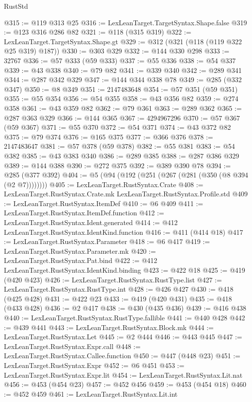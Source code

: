 \begin{lexlean}{RustStd}
\begin{coremodule}
@315 := @119 @313 @25
@316 := LexLeanTarget.TargetSyntax.Shape.false
@319 := @123 @316 @286 @82
@321 := @118 (@315 @319)
@322 := LexLeanTarget.TargetSyntax.Shape.gt
@329 := @312 (@321 (@118 (@119 @322 @25 @319) @187))
@330 := @303 @329
@332 := @144 @330 @298
@333 := 32767
@336 := @57 @333 (@59 @333)
@337 := @55 @336
@338 := @54 @337
@339 := @43 @338
@340 := @79 @82
@341 := @339 @340
@342 := @289 @341
@344 := @287 @342 @329
@347 := @144 @344 @338 @78
@349 := @285 (@332 @347)
@350 := @8 @349
@351 := 2147483648
@354 := @57 @351 (@59 @351)
@355 := @55 @354
@356 := @54 @355
@358 := @43 @356 @82
@359 := @274 @358
@361 := @43 @359 @82
@362 := @79 @361
@363 := @289 @362
@365 := @287 @363 @329
@366 := @144 @365
@367 := 4294967296
@370 := @57 @367 (@59 @367)
@371 := @55 @370
@372 := @54 @371
@374 := @43 @372 @82
@375 := @79 @374
@376 := @165 @375
@377 := @366 @376
@378 := 2147483647
@381 := @57 @378 (@59 @378)
@382 := @55 @381
@383 := @54 @382
@385 := @43 @383 @340
@386 := @289 @385
@388 := @287 @386 @329
@389 := @144 @388
@390 := @272 @375
@392 := @389 @390 @78
@394 := @285 (@377 @392)
@404 := @5 (@94 (@192 (@251 (@267 (@281 (@350 (@8 @394 (@2 @7))))))))
@405 := LexLeanTarget.RustSyntax.Crate
@408 := LexLeanTarget.RustSyntax.Crate.mk LexLeanTarget.RustSyntax.Profile.std
@409 := LexLeanTarget.RustSyntax.ItemDef
@410 := @6 @409
@411 := LexLeanTarget.RustSyntax.ItemDef.function
@412 := LexLeanTarget.RustSyntax.Ident.generated
@414 := @412 LexLeanTarget.RustSyntax.IdentKind.function
@416 := @411 (@414 @18)
@417 := LexLeanTarget.RustSyntax.Parameter
@418 := @6 @417
@419 := LexLeanTarget.RustSyntax.Parameter.mk
@420 := LexLeanTarget.RustSyntax.Pat.bind
@422 := @412 LexLeanTarget.RustSyntax.IdentKind.binding
@423 := @422 @18
@425 := @419 (@420 @423)
@426 := LexLeanTarget.RustSyntax.RustType.list
@427 := LexLeanTarget.RustSyntax.RustType.int
@428 := @426 @427
@430 := @418 (@425 @428)
@431 := @422 @23
@433 := @419 (@420 @431)
@435 := @418 (@433 @428)
@436 := @2 @417
@438 := @430 (@435 @436)
@439 := @416 @438
@440 := LexLeanTarget.RustSyntax.RustType.fallible
@441 := @440 @428
@442 := @439 @441
@443 := LexLeanTarget.RustSyntax.Block.mk
@444 := LexLeanTarget.RustSyntax.Let
@445 := @2 @444
@446 := @443 @445
@447 := LexLeanTarget.RustSyntax.Expr.call
@448 := LexLeanTarget.RustSyntax.Callee.function
@450 := @447 (@448 @23)
@451 := LexLeanTarget.RustSyntax.Expr
@452 := @6 @451
@453 := LexLeanTarget.RustSyntax.Expr.lit
@454 := LexLeanTarget.RustSyntax.Lit.nat
@456 := @453 (@454 @23)
@457 := @452 @456
@459 := @453 (@454 @18)
@460 := @452 @459
@461 := LexLeanTarget.RustSyntax.Lit.int

\end{coremodule}
\end{lexlean}
